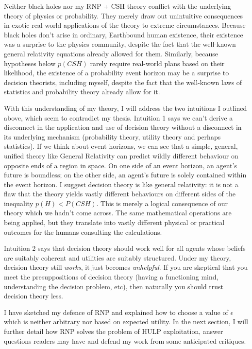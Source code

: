 \documentclass{article}
\begin{document}
Neither black holes nor my RNP + CSH theory conflict with the underlying theory of physics or probability. They merely draw out unintuitive consequences in exotic real-world applications of the theory to extreme circumstances. Because black holes don't arise in ordinary, Earthbound human existence, their existence was a surprise to the physics community, despite the fact that the well-known general relativity equations already allowed for them. Similarly, because hypotheses below \(p(CSH)\) rarely require real-world plans based on their likelihood, the existence of a probability event horizon may be a surprise to decision theorists, including myself, despite the fact that the well-known laws of statistics and probability theory already allow for it.

With this understanding of my theory, I will address the two intuitions I outlined above, which seem to contradict my thesis. Intuition 1 says we can't derive a disconnect in the application and use of decision theory without a disconnect in its underlying mechanism (probability theory, utility theory and perhaps statistics). If we think about event horizons, we can see that a simple, general, unified theory like General Relativity can predict wildly different behaviour on opposite ends of a region in space. On one side of an event horizon, an agent's future is boundless; on the other side, an agent's future is solely contained within the event horizon. I suggest decision theory is like general relativity: it is not a flaw that the theory yields vastly different behaviours on different sides of the inequality \(p(H)<P(CSH)\). This is merely a logical consequence of our theory which we hadn't come across. The same mathematical operations are being applied, but they translate into vastly different physical or practical outcomes for the humans consulting the calculations.

Intuition 2 says that decision theory should work well for all agents whose beliefs are suitably coherent and utilities are suitably structured. Under my theory, decision theory still \textit{works}, it just becomes \textit{unhelpful}. If you are skeptical that you meet the presuppositions of decision theory (having a functioning mind, understanding the decision problem, etc), then naturally you should trust decision theory less.

I have sketched my defence of RNP and explained how to choose a value of \(\epsilon\) which is neither arbitrary nor based on expected utility. In the next section, I will further detail how RNP solves the problem of HULP exploitation, answer questions readers may have and defend my work from some anticipated critiques. 
\end{document}
